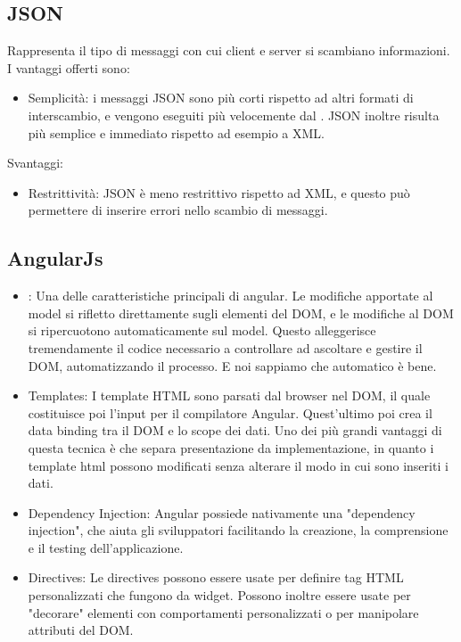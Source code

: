\subsection{JSON}
Rappresenta il tipo di messaggi con cui client e server si scambiano informazioni. I vantaggi offerti sono:
\begin{itemize}
\item Semplicità: i messaggi JSON sono più corti rispetto ad altri formati di interscambio, e vengono eseguiti più velocemente dal . JSON inoltre risulta più semplice e immediato rispetto ad esempio a XML.
\end{itemize}
Svantaggi:
\begin{itemize}
\item Restrittività: JSON è meno restrittivo rispetto ad XML, e questo può permettere di inserire errori nello scambio di messaggi.
\end{itemize}

\subsection{AngularJs}
\begin{itemize}
\item {}: Una delle caratteristiche principali di angular. Le modifiche apportate al model si rifletto direttamente sugli elementi del DOM, e le modifiche al DOM si ripercuotono automaticamente sul model. Questo alleggerisce tremendamente il codice necessario a controllare ad ascoltare e gestire il DOM, automatizzando il processo. E noi sappiamo che automatico è bene.
\item Templates: I template HTML sono parsati dal browser nel DOM, il quale costituisce poi l'input per il compilatore Angular. Quest'ultimo poi crea il data binding tra il DOM e lo scope dei dati. Uno dei più grandi vantaggi di questa tecnica è che separa presentazione da implementazione, in quanto i template html possono modificati senza alterare il modo in cui sono inseriti i dati.
\item Dependency Injection: Angular possiede nativamente una "dependency injection", che aiuta gli sviluppatori facilitando la creazione, la comprensione e il testing dell'applicazione.
\item Directives: Le directives possono essere usate per definire tag HTML personalizzati che fungono da widget. Possono inoltre essere usate per "decorare" elementi con comportamenti personalizzati o per manipolare attributi del DOM. 

\end{itemize}

